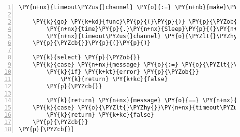 \begin{Verbatim}[commandchars=\\\{\},numbers=left,firstnumber=1,stepnumber=1,frame=single]
	\PY{n+nx}{timeout\PYZus{}channel} \PY{o}{:=} \PY{n+nb}{make}\PY{p}{(}\PY{k+kd}{chan} \PY{k+kt}{bool}\PY{p}{,} \PY{l+m+mi}{1}\PY{p}{)}

	\PY{k}{go} \PY{k+kd}{func}\PY{p}{(}\PY{p}{)} \PY{p}{\PYZob{}}
		\PY{n+nx}{time}\PY{p}{.}\PY{n+nx}{Sleep}\PY{p}{(}\PY{n+nx}{remainingTime}\PY{p}{(}\PY{p}{)}\PY{p}{)}
		\PY{n+nx}{timeout\PYZus{}channel} \PY{o}{\PYZlt{}\PYZhy{}} \PY{k+kc}{true}
	\PY{p}{\PYZcb{}}\PY{p}{(}\PY{p}{)}

	\PY{k}{select} \PY{p}{\PYZob{}}
	\PY{k}{case} \PY{n+nx}{message} \PY{o}{:=} \PY{o}{\PYZlt{}\PYZhy{}}\PY{n+nx}{queue}\PY{p}{:}
		\PY{k}{if} \PY{k+kt}{error} \PY{p}{\PYZob{}}
			\PY{k}{return} \PY{k+kc}{false}
		\PY{p}{\PYZcb{}}

		\PY{k}{return} \PY{n+nx}{message} \PY{o}{==} \PY{n+nx}{text}
	\PY{k}{case} \PY{o}{\PYZlt{}\PYZhy{}}\PY{n+nx}{timeout\PYZus{}channel}\PY{p}{:}
		\PY{k}{return} \PY{k+kc}{false}
	\PY{p}{\PYZcb{}}
\PY{p}{\PYZcb{}}
\end{Verbatim}
